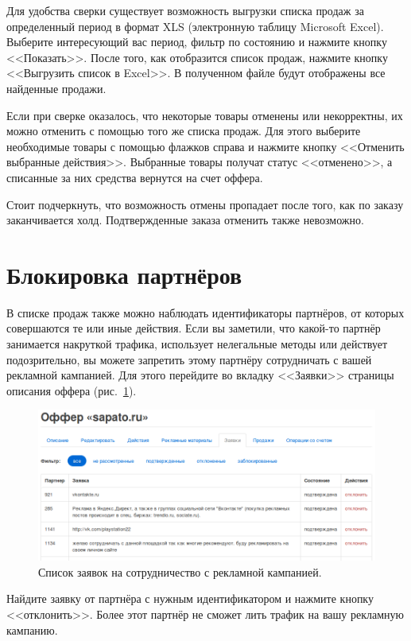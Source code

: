 \documentclass[a4paper,12pt]{article}
\begin{document}
Для удобства сверки существует возможность выгрузки списка продаж за определенный период в формат XLS (электронную таблицу Microsoft Excel). Выберите интересующий вас период, фильтр по состоянию и нажмите кнопку <<Показать>>. После того, как отобразится список продаж, нажмите кнопку <<Выгрузить список в Excel>>. В полученном файле будут отображены все найденные продажи.

Если при сверке оказалось, что некоторые товары отменены или некорректны, их можно отменить с помощью того же списка продаж. Для этого выберите необходимые товары с помощью флажков справа и нажмите кнопку <<Отменить выбранные действия>>. Выбранные товары получат статус <<отменено>>, а списанные за них средства вернутся на счет оффера.

Стоит подчеркнуть, что возможность отмены пропадает после того, как по заказу заканчивается холд. Подтвержденные заказа отменить также невозможно.

\section{Блокировка партнёров}

В списке продаж также можно наблюдать идентификаторы партнёров, от которых совершаются те или иные действия. Если вы заметили, что какой-то партнёр занимается накруткой трафика, использует нелегальные методы или действует подозрительно, вы можете запретить этому партнёру сотрудничать с вашей рекламной кампанией. Для этого перейдите во вкладку <<Заявки>> страницы описания оффера (рис.~\ref{fig:requests}).

\begin{figure}[!ht]
\centering
\includegraphics[width=\textwidth]{include/requests.png}
\caption{Список заявок на сотрудничество с рекламной кампанией.}
\label{fig:requests}
\end{figure}

Найдите заявку от партнёра с нужным идентификатором и нажмите кнопку <<отклонить>>. Более этот партнёр не сможет лить трафик на вашу рекламную кампанию.
\end{document}

